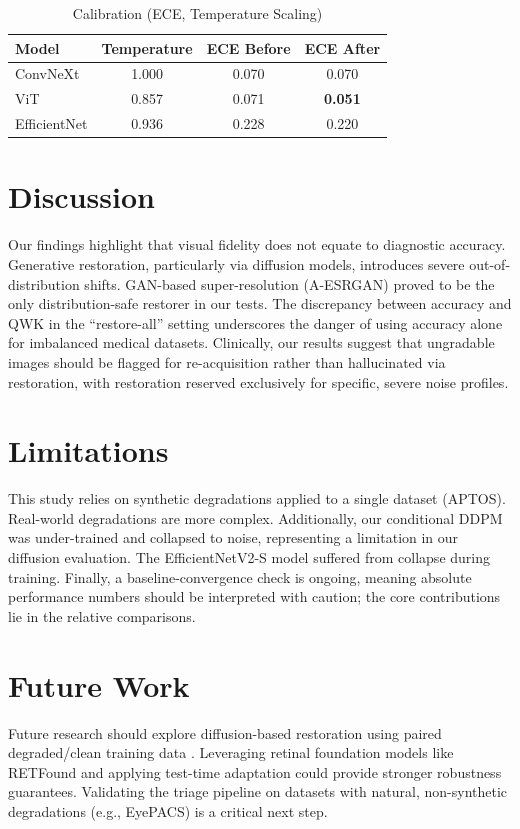 \documentclass[conference]{IEEEtran}
\begin{document}
\begin{table}[htbp]
\caption{Calibration (ECE, Temperature Scaling)}
\begin{center}
\begin{tabular}{lccc}
\toprule
\textbf{Model} & \textbf{Temperature} & \textbf{ECE Before} & \textbf{ECE After} \\
\midrule
ConvNeXt & 1.000 & 0.070 & 0.070 \\
ViT & 0.857 & 0.071 & \textbf{0.051} \\
EfficientNet & 0.936 & 0.228 & 0.220 \\
\bottomrule
\end{tabular}
\label{tab:calibration}
\end{center}
\end{table}

\section{Discussion}
Our findings highlight that visual fidelity does not equate to diagnostic accuracy. Generative restoration, particularly via diffusion models, introduces severe out-of-distribution shifts. GAN-based super-resolution (A-ESRGAN) proved to be the only distribution-safe restorer in our tests. The discrepancy between accuracy and QWK in the ``restore-all'' setting underscores the danger of using accuracy alone for imbalanced medical datasets. Clinically, our results suggest that ungradable images should be flagged for re-acquisition rather than hallucinated via restoration, with restoration reserved exclusively for specific, severe noise profiles.

\section{Limitations}
This study relies on synthetic degradations applied to a single dataset (APTOS). Real-world degradations are more complex. Additionally, our conditional DDPM was under-trained and collapsed to noise, representing a limitation in our diffusion evaluation. The EfficientNetV2-S model suffered from collapse during training. Finally, a baseline-convergence check is ongoing, meaning absolute performance numbers should be interpreted with caution; the core contributions lie in the relative comparisons.

\section{Future Work}
Future research should explore diffusion-based restoration using paired degraded/clean training data \cite{arxiv230809388}. Leveraging retinal foundation models like RETFound \cite{zhou2023retfound} and applying test-time adaptation \cite{wang2021tent} could provide stronger robustness guarantees. Validating the triage pipeline on datasets with natural, non-synthetic degradations (e.g., EyePACS) is a critical next step.
\end{document}
